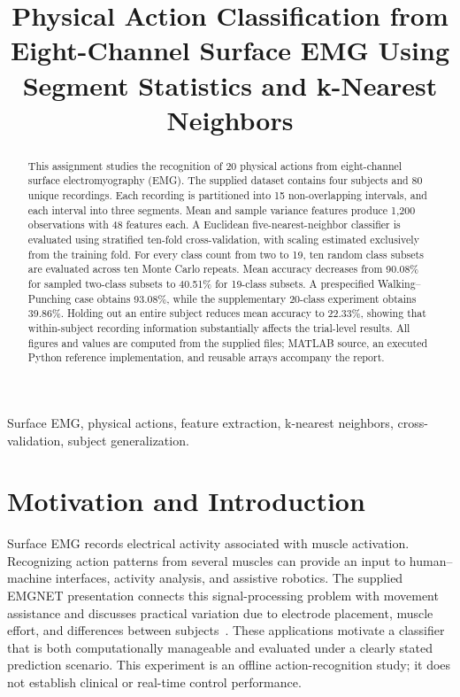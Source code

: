 \documentclass[journal]{IEEEtran}
\title{Physical Action Classification from Eight-Channel Surface EMG Using Segment Statistics and k-Nearest Neighbors}
\begin{document}
\maketitle
\begin{abstract}
This assignment studies the recognition of 20 physical actions from eight-channel surface electromyography (EMG). The supplied dataset contains four subjects and 80 unique recordings. Each recording is partitioned into 15 non-overlapping intervals, and each interval into three segments. Mean and sample variance features produce 1,200 observations with 48 features each. A Euclidean five-nearest-neighbor classifier is evaluated using stratified ten-fold cross-validation, with scaling estimated exclusively from the training fold. For every class count from two to 19, ten random class subsets are evaluated across ten Monte Carlo repeats. Mean accuracy decreases from 90.08\% for sampled two-class subsets to 40.51\% for 19-class subsets. A prespecified Walking--Punching case obtains 93.08\%, while the supplementary 20-class experiment obtains 39.86\%. Holding out an entire subject reduces mean accuracy to 22.33\%, showing that within-subject recording information substantially affects the trial-level results. All figures and values are computed from the supplied files; MATLAB source, an executed Python reference implementation, and reusable arrays accompany the report.
\end{abstract}
\begin{IEEEkeywords}
Surface EMG, physical actions, feature extraction, k-nearest neighbors, cross-validation, subject generalization.
\end{IEEEkeywords}

\section{Motivation and Introduction}
Surface EMG records electrical activity associated with muscle activation. Recognizing action patterns from several muscles can provide an input to human--machine interfaces, activity analysis, and assistive robotics. The supplied EMGNET presentation connects this signal-processing problem with movement assistance and discusses practical variation due to electrode placement, muscle effort, and differences between subjects~\cite{slides}. These applications motivate a classifier that is both computationally manageable and evaluated under a clearly stated prediction scenario. This experiment is an offline action-recognition study; it does not establish clinical or real-time control performance.
\end{document}
